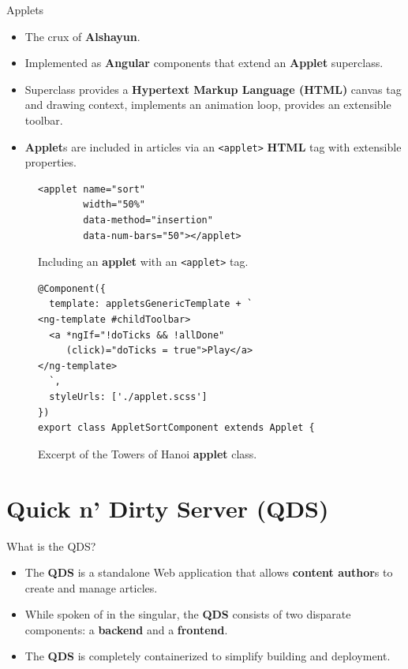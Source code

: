 \documentclass{beamer}
\begin{document}
\begin{frame}{Applets}
    \begin{itemize}
        \item The crux of \textbf{Alshayun}.
        \item Implemented as \textbf{Angular} components that extend an
            \textbf{Applet} superclass.
        \item Superclass provides a \textbf{Hypertext Markup Language (HTML)}
            canvas tag and drawing context, implements an animation loop,
            provides an extensible toolbar.
        \item \textbf{Applet}s are included in articles via an \texttt{<applet>}
            \textbf{HTML} tag with extensible properties.
    \end{itemize}
    \begin{figure}
    \begin{verbatim}
<applet name="sort"
        width="50%"
        data-method="insertion"
        data-num-bars="50"></applet>
    \end{verbatim}
        \caption{Including an \textbf{applet} with an \texttt{<applet>} tag.}
    \end{figure}
    \begin{figure}
    \begin{verbatim}
@Component({
  template: appletsGenericTemplate + `
<ng-template #childToolbar>
  <a *ngIf="!doTicks && !allDone"
     (click)="doTicks = true">Play</a>
</ng-template>
  `,
  styleUrls: ['./applet.scss']
})
export class AppletSortComponent extends Applet {
    \end{verbatim}
        \caption{Excerpt of the Towers of Hanoi \textbf{applet} class.}
    \end{figure}
\end{frame}

\section{Quick n' Dirty Server (QDS)}

\begin{frame}{What is the QDS?}
    \begin{itemize}
        \item The \textbf{QDS} is a standalone Web application that allows
            \textbf{content author}s to create and manage articles.
        \item While spoken of in the singular, the \textbf{QDS} consists of two
            disparate components: a \textbf{backend} and a \textbf{frontend}.
        \item The \textbf{QDS} is completely containerized to simplify building
            and deployment.
    \end{itemize}
\end{frame}
\end{document}
